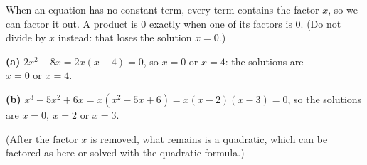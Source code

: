 When an equation has no constant term, every term contains the factor $x$, so we can factor it out. A product is $0$ exactly when one of its factors is $0$. (Do not divide by $x$ instead: that loses the solution $x=0$.)

\textbf{(a)} $2x^2-8x=2x(x-4)=0$, so $x=0$ or $x=4$: the solutions are $\boxed{x=0\text{ or }x=4}$.

\textbf{(b)} $x^3-5x^2+6x=x\left(x^2-5x+6\right)=x(x-2)(x-3)=0$, so the solutions are $\boxed{x=0,\ x=2\text{ or }x=3}$.

(After the factor $x$ is removed, what remains is a quadratic, which can be factored as here or solved with the quadratic formula.)
